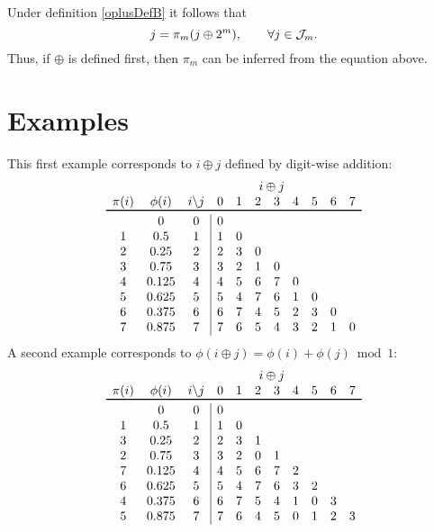 \documentclass[12pt]{amsart}
\begin{document}
Under definition \eqref{oplusDefB} it follows that 
\begin{equation*}
    j = \pi_m(j \oplus 2^m),  \qquad \forall j \in \mathcal{J}_m.
\end{equation*}
Thus, if $\oplus$ is defined first, then $\pi_m$ can be inferred from the equation above.



\section{Examples}

This first example corresponds to $i \oplus j$ defined by digit-wise addition:
\[
\begin{array}{ccc|cccccccc}
&& \multicolumn{9}{c}{i \oplus j} \\
 \pi(i) & \phi(i) & \multicolumn{1}{c}{i\backslash j} & 0 & 1 & 2 & 3 & 4 & 5 & 6 & 7 \\ 
    \toprule
      & 0 & 0 & 0\\
    1 & 0.5 & 1 & 1 & 0 \\
    2 & 0.25  & 2 & 2 & 3 & 0\\
    3 & 0.75  & 3 & 3 & 2 & 1 & 0\\
    4 & 0.125 & 4 & 4 & 5 & 6 & 7 & 0\\
    5 & 0.625 & 5 & 5 & 4 & 7 & 6 & 1 & 0\\
    6 & 0.375 & 6 & 6 & 7 & 4 & 5 & 2 & 3 & 0\\
    7 & 0.875 & 7 & 7 & 6 & 5 & 4 & 3 & 2 & 1 & 0\\
\end{array}
\]
A second example corresponds to $\phi(i \oplus j) = \phi(i) + \phi(j) \bmod 1$:
\[
\begin{array}{ccc|ccccccccc}
&& \multicolumn{9}{c}{i \oplus j} \\
 \pi(i) & \phi(i) & \multicolumn{1}{c}{i\backslash j} & 0 & 1 & 2 & 3 & 4 & 5 & 6 & 7 \\ 
    \toprule
      & 0 &     0 & 0\\
    1 & 0.5   & 1 & 1 & 0 \\
    3 & 0.25  & 2 & 2 & 3 & 1\\
    2 & 0.75  & 3 & 3 & 2 & 0 & 1\\
    7 & 0.125 & 4 & 4 & 5 & 6 & 7 & 2\\
    6 & 0.625 & 5 & 5 & 4 & 7 & 6 & 3 & 2\\
    4 & 0.375 & 6 & 6 & 7 & 5 & 4 & 1 & 0 & 3\\
    5 & 0.875 & 7 & 7 & 6 & 4 & 5 & 0 & 1 & 2 & 3\\
\end{array}
\]
\end{document}
